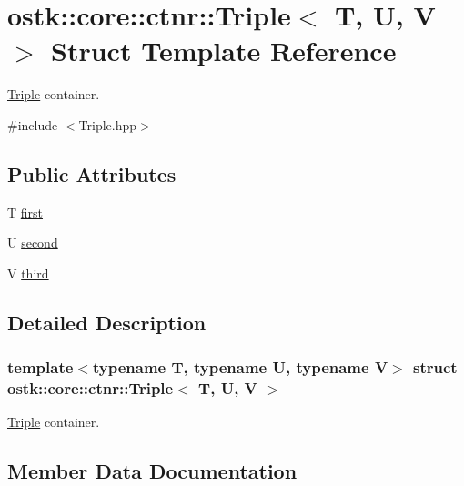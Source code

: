 \hypertarget{structostk_1_1core_1_1ctnr_1_1_triple}{}\section{ostk\+:\+:core\+:\+:ctnr\+:\+:Triple$<$ T, U, V $>$ Struct Template Reference}
\label{structostk_1_1core_1_1ctnr_1_1_triple}


\hyperlink{structostk_1_1core_1_1ctnr_1_1_triple}{Triple} container.  




{\ttfamily \#include $<$Triple.\+hpp$>$}

\subsection*{Public Attributes}
\begin{DoxyCompactItemize}
\item 
T \hyperlink{structostk_1_1core_1_1ctnr_1_1_triple_a0cc41738c17be0038d440821f2e8022a}{first}
\item 
U \hyperlink{structostk_1_1core_1_1ctnr_1_1_triple_a20851607908231eb1bca53693655a31c}{second}
\item 
V \hyperlink{structostk_1_1core_1_1ctnr_1_1_triple_a47c1a85baaeeff5ca5e08cf93047c2d2}{third}
\end{DoxyCompactItemize}


\subsection{Detailed Description}
\subsubsection*{template$<$typename T, typename U, typename V$>$\newline
struct ostk\+::core\+::ctnr\+::\+Triple$<$ T, U, V $>$}

\hyperlink{structostk_1_1core_1_1ctnr_1_1_triple}{Triple} container. 

\subsection{Member Data Documentation}
\mbox{\label{structostk_1_1core_1_1ctnr_1_1_triple_a0cc41738c17be0038d440821f2e8022a}} 
